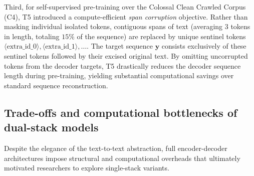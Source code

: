 \documentclass[../../../main.tex]{subfiles}
\begin{document}
Third, for self-supervised pre-training over the Colossal Clean Crawled Corpus (C4), T5 introduced a compute-efficient \emph{span corruption} objective. Rather than masking individual isolated tokens, contiguous spans of text (averaging 3 tokens in length, totaling $15\%$ of the sequence) are replaced by unique sentinel tokens $\langle\text{extra\_id\_0}\rangle, \langle\text{extra\_id\_1}\rangle, \dots$. The target sequence $\mathbf{y}$ consists exclusively of these sentinel tokens followed by their excised original text. By omitting uncorrupted tokens from the decoder targets, T5 drastically reduces the decoder sequence length during pre-training, yielding substantial computational savings over standard sequence reconstruction.


\subsection{Trade-offs and computational bottlenecks of dual-stack models}
\label{subsec:tradeoffs_enc_dec}

Despite the elegance of the text-to-text abstraction, full encoder-decoder architectures impose structural and computational overheads that ultimately motivated researchers to explore single-stack variants.
\end{document}
